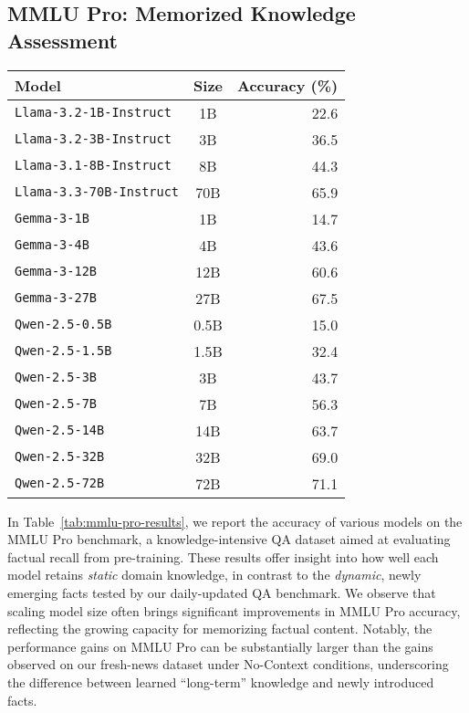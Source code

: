\documentclass[11pt]{article}
\begin{document}
\clearpage
\subsection{MMLU Pro: Memorized Knowledge Assessment}
\label{sec:mmlu-pro-appendix}

\begin{table*}[ht]
    \centering
    \caption{\textbf{MMLU Pro Results} (\% accuracy). 
    We report performance on a knowledge-intensive QA benchmark, reflecting memorized or static knowledge from pre-training.}
    \label{tab:mmlu-pro-results}
    \begin{tabular}{lcr}
        \toprule
        \textbf{Model} & \textbf{Size} & \textbf{Accuracy (\%)} \\
        \midrule
        \texttt{Llama-3.2-1B-Instruct}  & 1B   & 22.6 \\
        \texttt{Llama-3.2-3B-Instruct}  & 3B   & 36.5 \\
        \texttt{Llama-3.1-8B-Instruct}  & 8B   & 44.3 \\
        \texttt{Llama-3.3-70B-Instruct} & 70B  & 65.9 \\
        \midrule
        \texttt{Gemma-3-1B}   & 1B   & 14.7 \\
        \texttt{Gemma-3-4B}   & 4B   & 43.6 \\
        \texttt{Gemma-3-12B}  & 12B  & 60.6 \\
        \texttt{Gemma-3-27B}  & 27B  & 67.5 \\
        \midrule
        \texttt{Qwen-2.5-0.5B}  & 0.5B  & 15.0 \\
        \texttt{Qwen-2.5-1.5B}  & 1.5B  & 32.4 \\
        \texttt{Qwen-2.5-3B}    & 3B    & 43.7 \\
        \texttt{Qwen-2.5-7B}    & 7B    & 56.3 \\
        \texttt{Qwen-2.5-14B}   & 14B   & 63.7 \\
        \texttt{Qwen-2.5-32B}   & 32B   & 69.0 \\
        \texttt{Qwen-2.5-72B}   & 72B   & 71.1 \\
        \bottomrule
    \end{tabular}
\end{table*}


In Table~\ref{tab:mmlu-pro-results}, we report the accuracy of various models on the MMLU Pro benchmark, a knowledge-intensive QA dataset aimed at evaluating factual recall from pre-training.
These results offer insight into how well each model retains \emph{static} domain knowledge, in contrast to the \emph{dynamic}, newly emerging facts tested by our daily-updated QA benchmark.
We observe that scaling model size often brings significant improvements in MMLU Pro accuracy, reflecting the growing capacity for memorizing factual content. 
Notably, the performance gains on MMLU Pro can be substantially larger than the gains observed on our fresh-news dataset under No-Context conditions, underscoring the difference between learned “long-term” knowledge and newly introduced facts.
\end{document}

